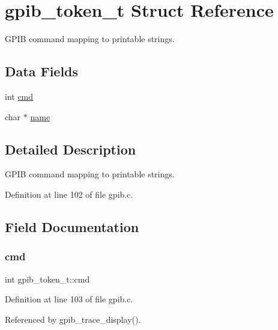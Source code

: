 \hypertarget{structgpib__token__t}{}\section{gpib\+\_\+token\+\_\+t Struct Reference}
\label{structgpib__token__t}


G\+P\+IB command mapping to printable strings.  


\subsection*{Data Fields}
\begin{DoxyCompactItemize}
\item 
int \hyperlink{structgpib__token__t_a8bc698b3cba149e3abbf935e623775c0}{cmd}
\item 
char $\ast$ \hyperlink{structgpib__token__t_aa47fb36b52bd83dc60e67a54f6e36e09}{name}
\end{DoxyCompactItemize}


\subsection{Detailed Description}
G\+P\+IB command mapping to printable strings. 

Definition at line 102 of file gpib.\+c.



\subsection{Field Documentation}
\mbox{\label{structgpib__token__t_a8bc698b3cba149e3abbf935e623775c0}} 
\subsubsection{\texorpdfstring{cmd}{cmd}}
{\footnotesize\ttfamily int gpib\+\_\+token\+\_\+t\+::cmd}



Definition at line 103 of file gpib.\+c.



Referenced by gpib\+\_\+trace\+\_\+display().

\mbox{\label{structgpib__token__t_aa47fb36b52bd83dc60e67a54f6e36e09}} 
